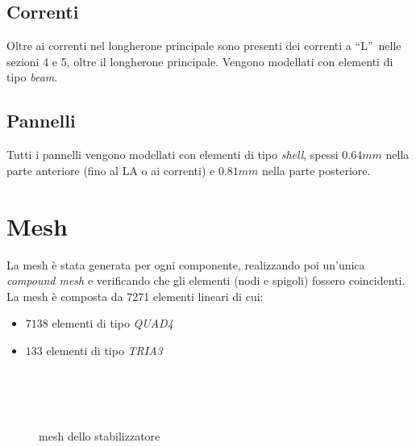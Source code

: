 \documentclass[
10pt, %
a4paper, %
oneside, %
headinclude,footinclude, %
BCOR5mm, %
]{scrartcl}
\begin{document}
\newpage

\subsection{Correnti}

Oltre ai correnti nel longherone principale sono presenti dei correnti a \textquotedblleft L\textquotedblright \ nelle sezioni 4 e 5, oltre il longherone principale. Vengono modellati con elementi di tipo \emph{beam}.

\subsection{Pannelli}

Tutti i pannelli vengono modellati con elementi di tipo \emph{shell}, spessi $0.64mm$ nella parte anteriore (fino al LA o ai correnti) e $0.81mm$ nella parte posteriore. 


\newpage

\section{Mesh}

La mesh è stata generata per ogni componente, realizzando poi un'unica \emph{compound mesh} e verificando che gli elementi (nodi e spigoli) fossero coincidenti.
La mesh è composta da 7271 elementi lineari di cui:

\begin{itemize}
	\item $7138$ elementi di tipo \emph{QUAD4}
	\item $133$ elementi di tipo \emph{TRIA3}
\end{itemize} 

\begin{figure}[tb]
	\centering
	 \\
	 \\
	 \\
	\caption[Mesh Stabilizzatore SF260]{mesh dello stabilizzatore} %
	\label{fig:mesh}
\end{figure}
\end{document}
